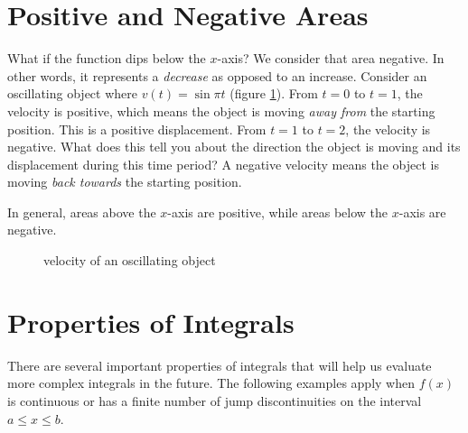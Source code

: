 \section{Positive and Negative Areas}
What if the function dips below the $x$-axis? We consider that area 
negative. In other words, it represents a \textit{decrease} as opposed to 
an increase. Consider an oscillating object where $v(t) = 
\sin{\pi t}$ (figure \ref{fig:oscillate}). From $t = 0$ to $t = 1$, 
the velocity is positive, which means the object is moving 
\textit{away from} the starting position. This is a positive 
displacement. From $t = 1$ to $t = 2$, the velocity is negative. What 
does this tell you about the direction the object is moving and its 
displacement during this time period? A negative velocity means the 
object is moving \textit{back towards} the starting position.

In general, areas above the $x$-axis are positive, while areas below 
the $x$-axis are negative.

\begin{figure}[H]
	\caption{velocity of an oscillating object}
	\label{fig:oscillate}
\end{figure}

\section{Properties of Integrals}
There are several important properties of integrals that will help us 
evaluate more complex integrals in the future. The following examples 
apply when $f(x)$ is continuous or has a finite number of jump 
discontinuities on the interval $a \leq x \leq b$.


